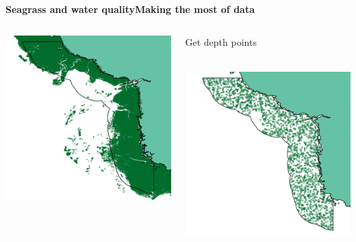 \documentclass[serif]{beamer}\usepackage[]{graphicx}\usepackage[]{color}
\makeatletter
\def\maxwidth{ %
  \ifdim\Gin@nat@width>\linewidth
    \linewidth
  \else
    \Gin@nat@width
  \fi
}
\newenvironment{knitrout}{}{} %
\makeatother
\begin{document}
\begin{frame}{\textbf{Seagrass and water quality}}{\textbf{Making the most of data}}
\begin{columns}[T]
\begin{column}{0.32\textwidth}
\begin{knitrout}
{\centering \includegraphics[width=\maxwidth]{fig//segsg} 

}



\end{knitrout}
\end{column}
\onslide<+->
\begin{column}{0.32\textwidth}
Get depth points\\~\\
\begin{knitrout}
\color{fgcolor}

{\centering \includegraphics[width=\maxwidth]{fig//segpt} 

}
\end{knitrout}
\end{column}
\end{columns}
\end{frame}
\end{document}
